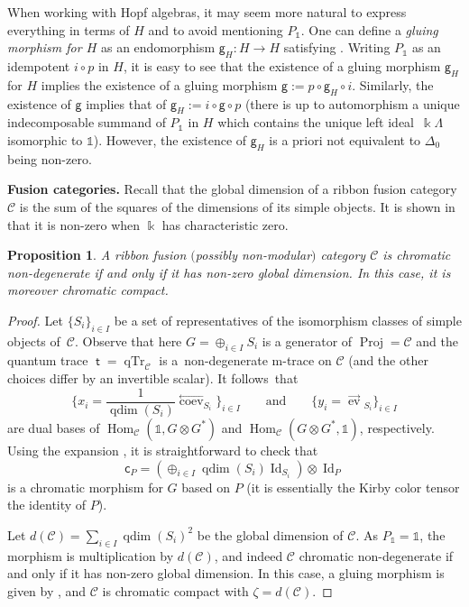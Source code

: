 \documentclass[10pt,a4paper]{amsart}
\newtheorem{proposition}{Proposition}
\numberwithin{equation}{section}
\newcommand{\Proj}{\operatorname{Proj}}
\newcommand{\chr}{{\mathsf{c}}}
\newcommand{\gm}{{\mathsf{g}}}
\numberwithin{theorem}{section}
\numberwithin{proposition}{section}
\numberwithin{definition}{section}
\numberwithin{lemma}{section}
\numberwithin{corollary}{section}
\numberwithin{remark}{section}
\numberwithin{example}{section}
\newcommand{\rev}{\stackrel{\longrightarrow}{\operatorname{ev}}\!\!}
\newcommand{\lcoev}{\stackrel{\longleftarrow}{\operatorname{coev}}}
\newcommand{\cat}{\mathcal{C}}
\newcommand{\Hom}{\operatorname{Hom}}
\newcommand{\unit}{\ensuremath{\mathds{1}}}
\newcommand{\Id}{\operatorname{Id}}
\newcommand{\qdim}{\operatorname{qdim}}
\newcommand{\FK}{{\Bbbk}}
\newcommand{\kk}{\Bbbk}
\newcommand{\mt}{{\operatorname{\mathsf{t}}}}
\newcommand{\CC}{\mathcal{C}}
\begin{document}
When working with Hopf algebras, it may
seem more natural to express everything in terms of $H$ and to avoid
mentioning $P_\unit$. One can define a \emph{gluing morphism for $H$}
as an endomorphism $\gm_H\colon H\to H$ satisfying
\smash{$\gm_H\circ \Delta_0^H=\Lambda_H$}. Writing $P_\unit$ as an idempotent
$i \circ p$ in $H$, it is easy to see that the existence of a gluing
morphism $\gm_H$ for $H$ implies the existence of a gluing morphism
$\gm:= p\circ \gm_H\circ i$. Similarly, the existence of $\gm$ implies
that of $\gm_H:= i\circ\gm\circ p$
(there is up to automorphism a unique indecomposable summand of
$P_\unit$ in $H$ which contains the unique left ideal~$\FK\Lambda$ isomorphic to $\unit$).
However, the
existence of $\gm_H$ is a priori not equivalent to $\Delta_0$ being
non-zero.

{\bf Fusion categories.} Recall that the global dimension of a ribbon fusion category $\cat$ is
the sum of the squares of the dimensions of its simple
objects. It is
shown in~\cite[Theorem~7.21.12]{EGNO} that it is non-zero when $\FK$
has characteristic zero.
\begin{proposition}\label{prop:semisimpleCompact}
 A ribbon fusion $($possibly non-modular$)$ category $\cat$ is chromatic non-degen\-er\-ate if and only if it has non-zero
 global dimension. In this case, it is moreover chromatic compact.
\end{proposition}
\begin{proof}
 Let $
\{S_i\}_{i\in I}$ be a set of representatives of the isomorphism
classes of simple objects of~$\cat$.
Observe that here $G=\oplus_{i\in I} S_i$ is
a generator of $\Proj=\cat$ and
the quantum trace $\mt=\operatorname{qTr}_\cat$ is
a~non-degenerate m-trace on $ \cat$ (and the other choices differ by an invertible scalar). It follows~that
\[
\biggl\{x_i=\frac{1}{\qdim(S_i)}\lcoev_{S_i}\biggr\}_{i\in I} \qquad\text{and}\qquad \bigl\{y_i=\rev_{S_i}\bigr\}_{i\in I}
\]
 are dual bases of $\Hom_\cat(\unit,G \otimes G^*)$ and $\Hom_\cat(G\otimes G^*,\unit)$, respectively. Using the expansion
\smash{$\Omega_{G\otimes G^*}=\sum_{i\in I} x_i\otimes_\kk y_i$}, it is straightforward to check that
\[\chr_P=(\oplus_{i\in I} \qdim(S_i)\Id_{S_i})\otimes \Id_P\]
is a chromatic morphism for $G$ based on $P$ (it is essentially the
Kirby color tensor the identity of $P$).

Let $d(\cat)= \sum_{i\in I} \qdim(S_i)^2$ be the global dimension of
$\cat$.
As $P_\unit=\unit$, the
morphism \smash{$\Delta_0^{P_\unit}$} is multiplication by $d(\cat)$, and indeed $\CC$ chromatic non-degenerate if and only if it has non-zero
 global dimension. In this case, a gluing morphism
is given by \smash{$\frac{1}{d(\cat)}{\rm Id}_\unit$}, and
$\cat$ is chromatic compact with $\zeta = d(\cat)$.
\end{proof}
\end{document}
